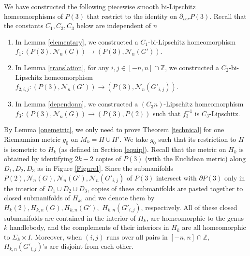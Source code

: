 \documentclass{amsart}
\begin{document}
We have constructed the following piecewise smooth bi-Lipschitz homeomorphisms of $P(3)$ that restrict to the identity on $\partial_{ver}P(3)$. Recall that the constants $C_1,C_2,C_3$ below are independent of $n$
\begin{enumerate}
\item In Lemma \ref{elementary}, we constructed a $C_1$-bi-Lipschitz homeomorphism $f_1:(P(3),\mathcal{N}_n(G))\to (P(3),\mathcal{N}_n(G'))$.
\item In Lemma \ref{translation}, for any $i,j\in [-n,n]\cap \mathbb{Z}$, we constructed a $C_2$-bi-Lipschitz homeomorphism $f_{2,i,j}:(P(3),\mathcal{N}_n(G'))\to (P(3),\mathcal{N}_n(G'_{i,j}))$.
\item In Lemma \ref{dependonn}, we constructed a $(C_3n)$-Lipschitz homeomorphism $f_3:(P(3),\mathcal{N}_n(G))\to (P(3),P(2))$ such that $f_3^{-1}$ is $C_3$-Lipschitz.
\end{enumerate}

By Lemma \ref{onemetric}, we only need to prove Theorem \ref{technical} for one Riemannian metric $g_0$ on $M_k=H\cup H'$. We take $g_0$ such that its restriction to $H$ is isometric to $H_k$ (as defined in Section \ref{equip}). Recall that the metric on $H_k$ is obtained by identifying $2k-2$ copies of $P(3)$ (with the Euclidean metric) along $D_1,D_2,D_3$ as in Figure \ref{Figure1}. Since the submanifolds $P(2), \mathcal{N}_n(G),\mathcal{N}_n(G'),\mathcal{N}_n(G'_{i,j})$ of $P(3)$ intersect with $\partial  P(3)$ only in the interior of $D_1\cup D_2\cup D_3$, copies of these submanifolds are pasted together to closed submanifolds of $H_k$, and we denote them by $H_k(2), H_{k,n}(G), H_{k,n}(G'), $ $H_{k,n}(G'_{i,j})$, respectively. All of these closed submanifolds are contained in the interior of $H_k$, are homeomorphic to the genus-$k$ handlebody, and the complements of their interiors in $H_k$ are all homeomorphic to $\Sigma_k\times I$. Moreover, when $(i,j)$ runs over all pairs in $[-n,n]\cap \mathbb{Z}$, $H_{k,n}(G'_{i,j})$'s are disjoint from each other.
\end{document}
